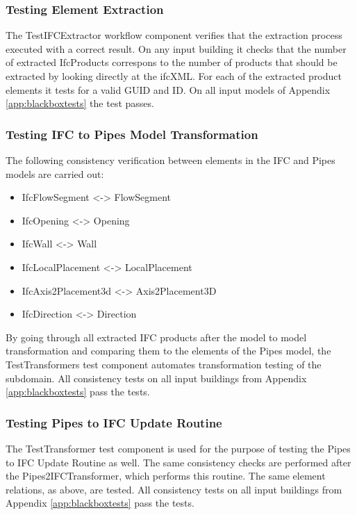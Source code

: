 \subsubsection{Testing Element Extraction}
The TestIFCExtractor workflow component verifies that the extraction process executed with a correct result. On any input building it checks that the number of extracted IfcProducts correspons to the number of products that should be extracted by looking directly at the ifcXML. For each of the extracted product elements it tests for a valid GUID and ID. On all input models of Appendix \ref{app:blackboxtests} the test passes.

\subsubsection{Testing IFC to Pipes Model Transformation}
The following consistency verification between elements in the IFC and Pipes models are carried out:

\begin{itemize}
	\item IfcFlowSegment <-> FlowSegment
	\item IfcOpening <-> Opening
	\item IfcWall <-> Wall
	\item IfcLocalPlacement <-> LocalPlacement
	\item IfcAxis2Placement3d <-> Axis2Placement3D
	\item IfcDirection <-> Direction
\end{itemize}

By going through all extracted IFC products after the model to model transformation and comparing them to the elements of the Pipes model, the TestTransformers test component automates transformation testing of the subdomain. All consistency tests on all input buildings from Appendix \ref{app:blackboxtests} pass the tests.

\subsubsection{Testing Pipes to IFC Update Routine}
The TestTransformer test component is used for the purpose of testing the Pipes to IFC Update Routine as well. The same consistency checks are performed after the Pipes2IFCTransformer, which performs this routine. The same element relations, as above, are tested. All consistency tests on all input buildings from Appendix \ref{app:blackboxtests} pass the tests.





